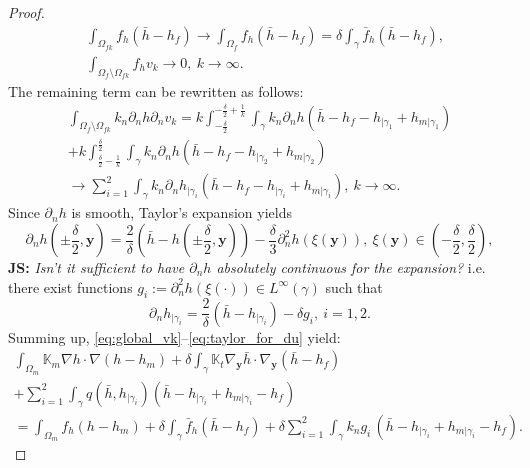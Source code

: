 \documentclass[a4paper]{article}
\def\vc#1{\mathbf{\boldsymbol{#1}}}     %
\def\tn#1{{\mathbb{#1}}}    %
\def\yy{{\vc y}}
\newcommand{\note}[2]{{\color{blue} \textbf{ #1:} \textit{#2}}}
\begin{document}
\begin{proof}
\begin{align}
&\int_{\Omega_{fk}} f_h (\bar h-h_f) \to \int_{\Omega_{f}} f_h (\bar h-h_f) = \delta\int_{\gamma} \bar f_h (\bar h-h_f), \\
&\int_{\Omega_f\setminus\Omega_{fk}} f_h v_k \to 0,~k\to\infty.
\end{align}
The remaining term can be rewritten as follows:
\begin{multline}
\int_{\Omega_f\setminus\Omega_{fk}} k_n\partial_n h \partial_n v_k
= k\int_{-\frac\delta2}^{-\frac\delta2+\frac1k}\int_\gamma k_n\partial_n h (\bar h - h_f - h_{|\gamma_1} + h_{m|\gamma_1})\\
+ k\int_{\frac\delta2-\frac1k}^{\frac\delta2}\int_\gamma k_n\partial_n h (\bar h - h_f - h_{|\gamma_2} + h_{m|\gamma_2})\\
\to \sum_{i=1}^2\int_\gamma k_n \partial_n h_{|\gamma_i} (\bar h - h_f - h_{|\gamma_i} + h_{m|\gamma_i}),~k\to\infty.
\end{multline}
Since $\partial_n h$ is smooth, Taylor's expansion yields
\[ \partial_n h(\pm\frac\delta2,\vc y) = \frac2\delta(\bar h - h(\pm\frac\delta2,\vc y)) - \frac\delta3\partial_n^2 h(\xi(\vc y)),~\xi(\yy)\in(-\frac\delta2,\frac\delta2), \]
\note{JS}{Isn't it sufficient to have $\partial_n h$ absolutely continuous for the expansion?}
i.e. there exist functions $g_i:=\partial^2_n h(\xi(\cdot))\in L^\infty(\gamma)$ such that
\begin{equation}
\label{eq:taylor_for_du}
\partial_n h_{|\gamma_i} = \frac2\delta(\bar h - h_{|\gamma_i}) - \delta g_i,~i=1,2.
\end{equation}
Summing up, \eqref{eq:global_vk}--\eqref{eq:taylor_for_du} yield:
\begin{multline}
\label{eq:sum_global_vk_limit}
\int_{\Omega_m}\tn K_m\nabla h\cdot\nabla(h-h_m)
+\delta\int_\gamma\tn K_t\nabla_\yy\bar h\cdot\nabla_\yy(\bar h-h_f)\\
+ \sum_{i=1}^2\int_\gamma q(\bar h,h_{|\gamma_i}) (\bar h - h_{|\gamma_i} + h_{m|\gamma_i} - h_f)\\
= \int_{\Omega_m} f_h (h-h_m)
+ \delta\int_{\gamma} \bar f_h (\bar h-h_f)
+ \delta\sum_{i=1}^2\int_\gamma k_n g_i\, (\bar h - h_{|\gamma_i} + h_{m|\gamma_i} - h_f).
\end{multline}


\end{proof}
\end{document}
